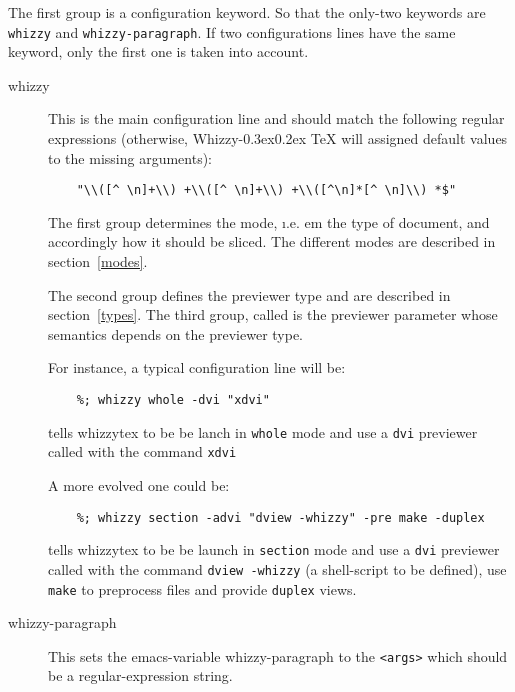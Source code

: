 \documentclass{article}
\let \lst \verb
\def \whizzy{{Whizzy\kern -0.3ex\raise 0.2ex \hbox{\TeX}}}
\begin{document}
The first group is a configuration keyword. 
So that the only-two  keywords are \lst"whizzy" and 
\lst"whizzy-paragraph". If two configurations
lines have the same keyword, only the first one is taken into
account.
\begin{description}
\item[whizzy]
This is the main configuration line and should match the following regular
expressions (otherwise, {\whizzy} will assigned default values to the
missing arguments): 
\begin{verbatim}
    "\\([^ \n]+\\) +\\([^ \n]+\\) +\\([^\n]*[^ \n]\\) *$"
\end{verbatim}
The first group determines the mode, {\i.e. em} the type of document, and
accordingly how it should be sliced.  The different modes are described in
section~\ref {modes}.

The second group defines the previewer type and are described in
section~\ref{types}.  The third group, called is the previewer parameter
whose semantics depends on the previewer type.

For instance, a typical configuration line will be:
\begin{verbatim}
    %; whizzy whole -dvi "xdvi"
\end{verbatim}
tells whizzytex to be be lanch in \lst"whole" mode and use a \lst"dvi"
previewer called with the command \lst"xdvi"

A more evolved one could be:
\begin{verbatim}
    %; whizzy section -advi "dview -whizzy" -pre make -duplex
\end{verbatim}
tells whizzytex to be be launch in \lst"section" mode and use a \lst"dvi"
previewer called with the command \lst"dview -whizzy" (a shell-script to be defined), use \lst"make" to
preprocess files and provide \lst"duplex" views.

\item[whizzy-paragraph]
This sets the emacs-variable whizzy-paragraph to the \lst"<args>"
which should be a regular-expression string. 
\end{description} 


\end{document}
